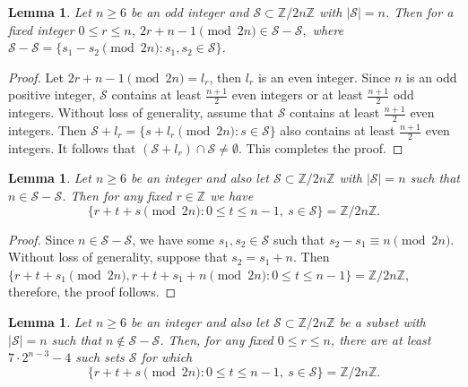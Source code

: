 \documentclass[11pt,reqno]{amsart}
\numberwithin{equation}{section}
\newtheorem{lemma}[theorem]{Lemma}
\begin{document}
\begin{lemma}\label{Lemma 2.3}
Let $n\geq6$ be an odd integer and $\mathcal{S}\subset \mathbb{Z}/2n\mathbb{Z}$ with $|\mathcal{S}|=n$. Then for a fixed integer $0\leq r\leq n$, $2r+n-1\pmod{2n}\in \mathcal{S}-\mathcal{S},$  where $\mathcal{S-S}=\{s_1-s_2\pmod{2n}: s_1,s_2\in \mathcal{S}\}$.
\end{lemma}
\begin{proof}
Let $2r+n-1\pmod{2n}=l_r$, then $l_r$ is an even integer. Since $n$ is an odd positive integer, $\mathcal{S}$ contains at least $\frac{n+1}{2}$ even integers or at least $\frac{n+1}{2}$ odd integers. Without loss of generality, assume that $\mathcal{S}$ contains at least $\frac{n+1}{2}$ even integers. Then $\mathcal{S}+l_r=\{s+l_r\pmod{2n}:s\in \mathcal{S}\}$ also contains at least $\frac{n+1}{2}$ even integers. It follows that $(\mathcal{S}+l_r)\cap\mathcal{S}\neq \emptyset$. This completes the proof.
\end{proof}
\begin{lemma}\label{Lemma 2.4}
Let $n\geq6$ be an integer and also let $\mathcal{S}\subset \mathbb{Z}/2n\mathbb{Z}$ with $|\mathcal{S}|=n$ such that $n\in \mathcal{S}-\mathcal{S}$. Then for any fixed $r\in \mathbb{Z}$ we have
$$\{r+t+s \pmod{2n}:0\leq t\leq n-1,\ s\in \mathcal{S}\}=\mathbb{Z}/2n\mathbb{Z}.$$
\end{lemma}
\begin{proof}
Since $n\in \mathcal{S}-\mathcal{S}$, we have some $s_1,s_2\in \mathcal{S}$ such that $s_2-s_1\equiv n \pmod{2n}$. Without loss of generality, suppose that $s_2=s_1+n$. Then 
$\{r+t+s_1 \pmod{2n},r+t+s_1+n\pmod{2n}:0\leq t\leq n-1\}=\mathbb{Z}/2n\mathbb{Z}$, therefore, the proof follows.
\end{proof}
\begin{lemma}\label{Lemma 2.5}
Let $n\geq6$ be an integer and also let $\mathcal{S}\subset \mathbb{Z}/2n\mathbb{Z}$ be a subset with $|\mathcal{S}|=n$ such that $n\not\in \mathcal{S}-\mathcal{S}$. Then, for any fixed $0\leq r\leq n$, there are at least $7\cdot 2^{n-3}-4$ such sets $\mathcal{S}$ for which 
$$\{r+t+s\pmod{2n}:0\leq t\leq n-1,\ s\in \mathcal{S}\}=\mathbb{Z}/2n\mathbb{Z}.$$
\end{lemma}
\end{document}
